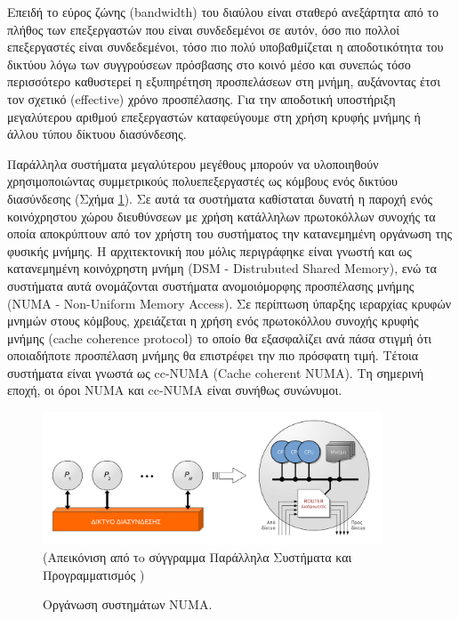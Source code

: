 Επειδή το εύρος ζώνης (bandwidth) του διαύλου είναι σταθερό ανεξάρτητα από το πλήθος των επεξεργαστών που είναι συνδεδεμένοι σε αυτόν, όσο πιο πολλοί επεξεργαστές είναι συνδεδεμένοι, τόσο πιο πολύ υποβαθμίζεται η αποδοτικότητα του δικτύου λόγω των συγγρούσεων πρόσβασης στο κοινό μέσο και συνεπώς τόσο περισσότερο καθυστερεί η εξυπηρέτηση προσπελάσεων στη μνήμη, αυξάνοντας έτσι τον σχετικό (effective) χρόνο προσπέλασης. Για την αποδοτική υποστήριξη μεγαλύτερου αριθμού επεξεργαστών καταφεύγουμε στη χρήση κρυφής μνήμης ή άλλου τύπου δίκτυου διασύνδεσης.

Παράλληλα συστήματα μεγαλύτερου μεγέθους μπορούν να υλοποιηθούν χρησιμοποιώντας συμμετρικούς πολυεπεξεργαστές ως κόμβους ενός δικτύου διασύνδεσης (Σχήμα \ref{fig:numa}). Σε αυτά τα συστήματα καθίσταται δυνατή η παροχή ενός κοινόχρηστου χώρου διευθύνσεων με χρήση κατάλληλων πρωτοκόλλων συνοχής τα οποία αποκρύπτουν από τον χρήστη του συστήματος την κατανεμημένη οργάνωση της φυσικής μνήμης. Η αρχιτεκτονική που μόλις περιγράφηκε είναι γνωστή και ως κατανεμημένη κοινόχρηστη μνήμη (DSM - Distrubuted Shared Memory), ενώ τα συστήματα αυτά ονομάζονται συστήματα ανομοιόμορφης προσπέλασης μνήμης (NUMA - Non-Uniform Memory Access). Σε περίπτωση ύπαρξης ιεραρχίας κρυφών μνημών στους κόμβους, χρειάζεται η χρήση ενός πρωτοκόλλου συνοχής κρυφής μνήμης (cache coherence protocol) το οποίο θα εξασφαλίζει ανά πάσα στιγμή ότι οποιαδήποτε προσπέλαση μνήμης θα επιστρέφει την πιο πρόσφατη τιμή. Τέτοια συστήματα είναι γνωστά ως cc-NUMA (Cache coherent NUMA). Τη σημερινή εποχή, οι όροι NUMA και cc-NUMA είναι συνήθως συνώνυμοι.

\begin{figure}[t]
	\centering
	\includegraphics[width=0.9\textwidth]{Figures/numa.png}
	\linebreak 
	{\small (Απεικόνιση από τo σύγγραμμα Παράλληλα Συστήματα και Προγραμματισμός \cite{dimakopoulos2015parallila})}
	\caption{Οργάνωση συστημάτων NUMA.}
	\label{fig:numa}
\end{figure}


